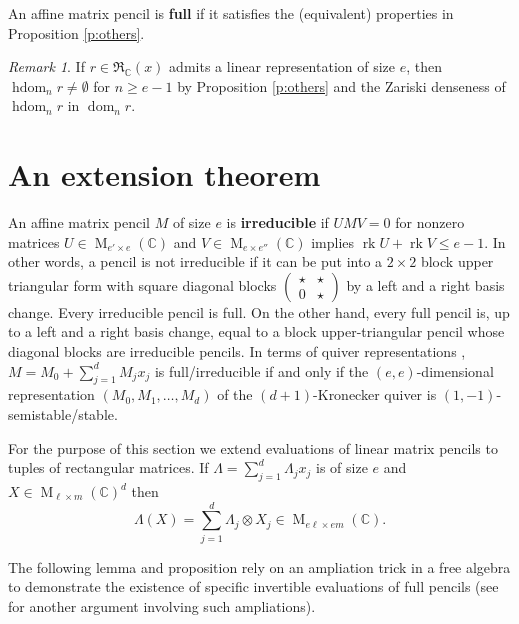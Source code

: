 \documentclass[12pt,a4paper]{amsart}
\DeclareMathOperator{\rk}{rk}
\DeclareMathOperator{\dom}{dom}
\DeclareMathOperator{\hdom}{hdom}
\DeclareMathOperator{\opm}{M}
\newcommand{\C}{\mathbb{C}}
\newcommand*{\mat}[1]{\opm_{#1}(\C)}
\newcommand{\rex}{\mathfrak{R}_{\C}(x)}
\theoremstyle{definition}
\theoremstyle{remark}
\newtheorem{rem}[thm]{Remark}
\numberwithin{equation}{section}
\begin{document}
An affine matrix pencil is {\bf full} \cite[Section 1.4]{Coh} if it satisfies the (equivalent) properties in Proposition \ref{p:others}.


\begin{rem}\label{r:dom}
If $r\in\rex$ admits a linear representation of size $e$, then $\hdom_n r\neq\emptyset$ for $n\ge e-1$ by Proposition \ref{p:others} and the Zariski denseness of $\hdom_n r$ in $\dom_n r$.
\end{rem}

\section{An extension theorem}\label{s3}

An affine matrix pencil $M$ of size $e$ is {\bf irreducible} if $UMV=0$ for nonzero matrices $U\in \mat{e'\times e}$ and $V\in\mat{e\times e''}$ implies $\rk U+\rk V\le e-1$. In other words, a pencil is not irreducible if
it can be put into a $2\times2$ block upper triangular form with square diagonal blocks
$(\begin{smallmatrix}\star & \star \\ 0 & \star\end{smallmatrix})$ 
by a left and a right basis change.
Every irreducible pencil is full. On the other hand, every full pencil is, up to a left and a right basis change, equal to a block upper-triangular pencil whose diagonal blocks are irreducible pencils. 
In terms of quiver representations \cite{Kin}, $M=M_0+\sum_{j=1}^dM_jx_j$ is full/irreducible if and only if the $(e,e)$-dimensional representation $(M_0,M_1,\dots,M_d)$ of the $(d+1)$-Kronecker quiver is $(1,-1)$-semistable/stable.

For the purpose of this section we extend evaluations of linear matrix pencils to tuples of rectangular matrices.
If $\Lambda=\sum_{j=1}^d \Lambda_jx_j$ is of size $e$ and $X\in\mat{\ell \times m}^d$ then
$$\Lambda(X)=\sum_{j=1}^d \Lambda_j\otimes X_j \in \mat{e\ell\times em}.$$

The following lemma and proposition rely on an ampliation trick in a free algebra to demonstrate the existence of specific invertible evaluations of full pencils (see \cite[Section 2.1]{HKV} for another argument involving such ampliations).
\end{document}
